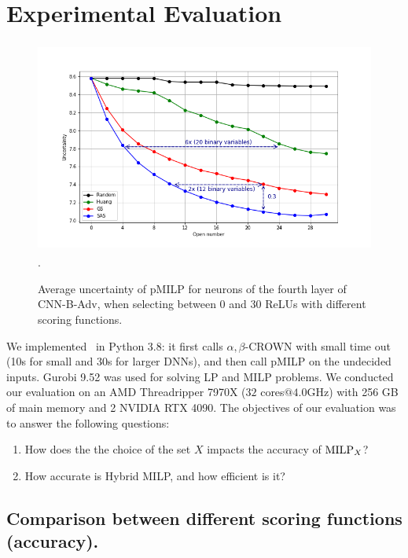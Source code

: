 \section{Experimental Evaluation}

\begin{figure}[b!]
	\centering
	\vspace*{-0.3cm}
	\includegraphics[height=7cm]{CNN-B-ADV_layer7_comparison_image85.png}.
	\vspace*{-0.4cm}
	\caption{Average uncertainty of pMILP for neurons of the fourth layer of CNN-B-Adv, 
	when selecting between 0 and 30 ReLUs with different scoring functions.}
	\label{fig_table3}
\end{figure}


%
We implemented \toolname\ in Python 3.8: it first calls $\alpha,\beta$-CROWN with small time out (10s for small and 30s for larger DNNs), and then call pMILP on the undecided inputs.
Gurobi 9.52 was used for solving LP and MILP problems. We conducted our evaluation on an AMD Threadripper 7970X  ($32$ cores$@4.0$GHz) with 256 GB of main memory and 2 NVIDIA RTX 4090. The  objectives of our evaluation was to answer the following  questions:
\vspace{-0.1cm}

\begin{enumerate}
	\item How does the the choice of the set $X$ impacts the accuracy of ${\textrm{MILP}}_X$? 
	\item How accurate is Hybrid MILP, and how efficient is it?
\end{enumerate}


\subsection{Comparison between different scoring functions (accuracy).}

